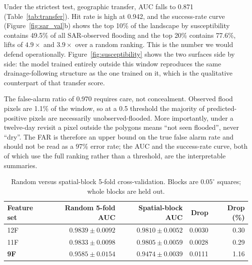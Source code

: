 \documentclass[11pt,a4paper]{article}
\begin{document}
Under the strictest test, geographic transfer, AUC falls to 0.871
(Table~\ref{tab:transfer}). Hit rate is high at 0.942, and the success-rate curve
(Figure~\ref{fig:sar_val}b) shows the top 10\% of the landscape by susceptibility
contains 49.5\% of all SAR-observed flooding and the top 20\% contains 77.6\%,
lifts of $4.9\times$ and $3.9\times$ over a random ranking. This is the number we
would defend operationally. Figure~\ref{fig:susceptibility} shows the two
surfaces side by side: the model trained entirely outside this window
reproduces the same drainage-following structure as the one trained on it,
which is the qualitative counterpart of that transfer score.

The false-alarm ratio of 0.970 requires care, not concealment. Observed
flood pixels are 1.1\% of the window, so at a 0.5 threshold the majority of
predicted-positive pixels are necessarily unobserved-flooded. More importantly,
under a twelve-day revisit a pixel outside the polygons means ``not seen
flooded'', never ``dry''. The FAR is therefore an upper bound on the true false
alarm rate and should not be read as a 97\% error rate; the AUC and the
success-rate curve, both of which use the full ranking rather than a threshold,
are the interpretable summaries.

\begin{table}[t]
\centering
\caption{Random versus spatial-block 5-fold cross-validation. Blocks are
$0.05^\circ$ squares; whole blocks are held out.}
\label{tab:spatial}
\small
\begin{tabular}{@{}lrrrr@{}}
\toprule
\textbf{Feature set} & \textbf{Random 5-fold AUC} & \textbf{Spatial-block AUC} &
\textbf{Drop} & \textbf{Drop (\%)} \\
\midrule
12F & $0.9839\pm0.0092$ & $0.9810\pm0.0052$ & 0.0030 & 0.30 \\
11F & $0.9833\pm0.0098$ & $0.9805\pm0.0059$ & 0.0028 & 0.29 \\
\textbf{9F} & $0.9585\pm0.0154$ & $0.9474\pm0.0039$ & 0.0111 & 1.16 \\
\bottomrule
\end{tabular}
\end{table}
\end{document}
